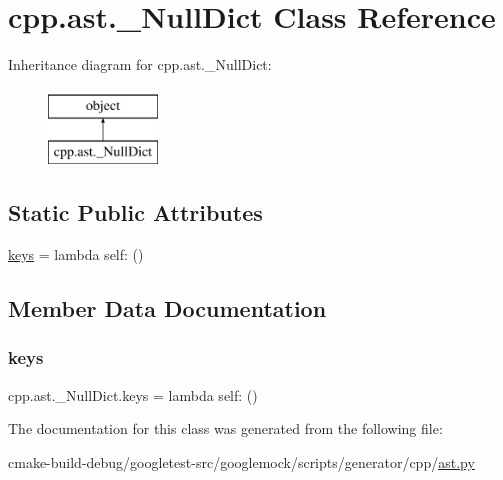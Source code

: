 \hypertarget{classcpp_1_1ast_1_1__NullDict}{}\section{cpp.\+ast.\+\_\+\+Null\+Dict Class Reference}
\label{classcpp_1_1ast_1_1__NullDict}
Inheritance diagram for cpp.\+ast.\+\_\+\+Null\+Dict\+:\begin{figure}[H]
\begin{center}
\leavevmode
\includegraphics[height=2.000000cm]{classcpp_1_1ast_1_1__NullDict}
\end{center}
\end{figure}
\subsection*{Static Public Attributes}
\begin{DoxyCompactItemize}
\item 
\mbox{\hyperlink{classcpp_1_1ast_1_1__NullDict_abb0b7884aa59bede0a8503dffcd1733f}{keys}} = lambda self\+: ()
\end{DoxyCompactItemize}


\subsection{Member Data Documentation}
\mbox{\label{classcpp_1_1ast_1_1__NullDict_abb0b7884aa59bede0a8503dffcd1733f}} 
\subsubsection{\texorpdfstring{keys}{keys}}
{\footnotesize\ttfamily cpp.\+ast.\+\_\+\+Null\+Dict.\+keys = lambda self\+: ()\hspace{0.3cm}{\ttfamily [static]}}



The documentation for this class was generated from the following file\+:\begin{DoxyCompactItemize}
\item 
cmake-\/build-\/debug/googletest-\/src/googlemock/scripts/generator/cpp/\mbox{\hyperlink{ast_8py}{ast.\+py}}\end{DoxyCompactItemize}
